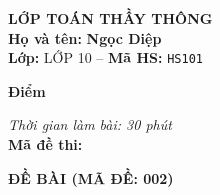 \noindent
\begin{tcolorbox}[colback=white,colframe=black,arc=0mm,boxrule=0.8pt,top=4pt,bottom=4pt,left=6pt,right=6pt]
	\begin{minipage}[c]{0.44\textwidth}
		{\bfseries\large LỚP TOÁN THẦY THÔNG}\\[3pt]
		\textbf{Họ và tên:} \textbf{\large Ngọc Diệp}\\[3pt]
		\textbf{Lớp:} LỚP 10 \quad -- \quad \textbf{Mã HS:} \texttt{HS101}
	\end{minipage}
	\hfill
	\begin{minipage}[c]{0.22\textwidth}
		\begin{tcolorbox}[colback=white,colframe=black,arc=0mm,boxrule=0.6pt,height=1.8cm,halign=center,valign=top,top=2pt]
			{\bfseries\normalsize Điểm}
		\end{tcolorbox}
	\end{minipage}
	\hfill
	\begin{minipage}[c]{0.30\textwidth}
		\raggedleft
		\textit{Thời gian làm bài: 30 phút}\\[4pt]
		\textbf{Mã đề thi:} 
	\end{minipage}
\end{tcolorbox}
\vspace{0.25cm}

\noindent\textbf{\large ĐỀ BÀI (MÃ ĐỀ: 002)}
\vspace{0.1cm}


